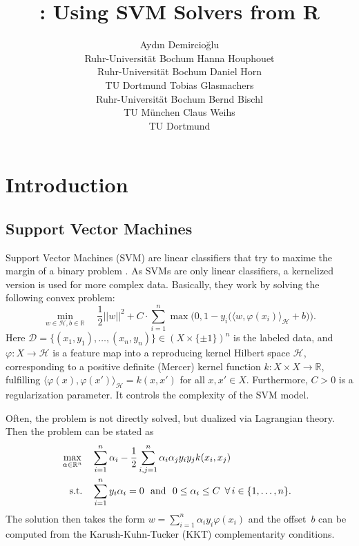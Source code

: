 \documentclass[article, shortnames]{jss}
\author{Ayd\i n Demircio\u{g}lu\\Ruhr-Universit\"at Bochum \And 
Hanna Houphouet\\Ruhr-Universit\"at Bochum \And 
        Daniel Horn\\TU Dortmund \AND
        Tobias Glasmachers\\Ruhr-Universit\"at Bochum \And 
        Bernd Bischl\\TU M\"unchen \And 
        Claus Weihs\\TU Dortmund}
\title{\pkg{SVMBridge}: Using SVM Solvers from R}
\newcommand{\R}{\mathbb{R}}
\begin{document}


\section{Introduction}



\subsection{Support Vector Machines}

Support Vector Machines (SVM) are linear classifiers
that try to maxime the margin of a binary problem \citep{cortes1995support}.
As SVMs are only linear classifiers, a kernelized version
is used for more complex data. Basically, they work by
solving the  following convex problem:
\begin{equation}
        \min_{w \in \mathcal{H}, b \in \R} \quad \frac{1}{2} ||w||^2 + C \cdot \sum_{i=1}^n \max \Big( 0, 1 - y_i \big( \langle w, \varphi(x_i) \rangle_{\mathcal{H}} + b \big) \Big).
        \label{SVMproblemPrimal}
\end{equation}
Here 
$\mathcal{D}=\{(x_1, y_1), \dots, (x_n, y_n)\} \in (X \times \{ \pm 1\})^n$
is the labeled data,
and  $\varphi : X \to \mathcal{H}$ is a feature map into a reproducing
kernel Hilbert space $\mathcal{H}$, corresponding to a positive definite
(Mercer) kernel function $k : X \times X \to \R$, fulfilling
$\langle \varphi(x), \varphi(x') \rangle_{\mathcal{H}} = k(x, x')$ for
all $x, x' \in X$. Furthermore, $C > 0$ is a regularization parameter.
It controls the complexity of the SVM model.

Often, the problem is not directly solved, but dualized via Lagrangian theory.
Then the problem can be stated as 
\begin{align}
        \max_{\alpha \in \R^n} \quad & \sum_{i=1}^n \alpha_i - \frac{1}{2} \sum_{i,j=1}^n \alpha_i \alpha_j y_i y_j k(x_i, x_j) \label{SVMproblemDual} \\
        \text{s.t.} \quad & \sum_{i=1}^{n} y_i \alpha_i = 0 \text{~~and~~} 0 \leq \alpha_i \leq C \,\,\, \forall \, i \in \{1, \dots, n\}. \notag
        \enspace
\end{align}
The solution then takes the form $w = \sum_{i=1}^n \alpha_i y_i \varphi(x_i)$
and the offset~$b$ can be computed from the Karush-Kuhn-Tucker (KKT)
complementarity conditions.
\end{document}
